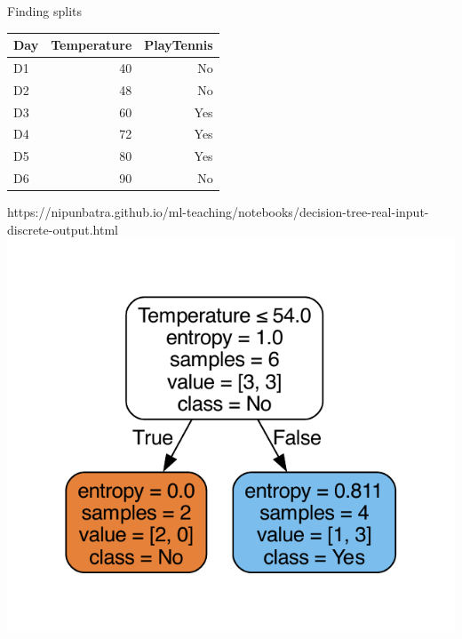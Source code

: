 \documentclass[usenames,dvipsnames]{beamer}
\begin{document}
			\begin{frame}{Finding splits}
				\begin{table}[]
					\begin{tabular}{@{}lrr@{}}
						\toprule
						\textbf{Day} & \textbf{Temperature} & \textbf{PlayTennis} \\ \midrule
						D1           & 40                   & No                  \\
						D2           & 48                   & No                  \\
						D3           & 60                   & Yes                 \\
						D4           & 72                   & Yes                 \\
						D5           & 80                   & Yes                 \\
						D6           & 90                   & No                  \\ \bottomrule
					\end{tabular}
				\end{table}
				\begin{notebookbox}{https://nipunbatra.github.io/ml-teaching/notebooks/decision-tree-real-input-discrete-output.html}
					\includegraphics[scale=0.3]{../assets/decision-trees/figures/real-ip-1.pdf}
				\end{notebookbox}
				\end{frame}
\end{document}
